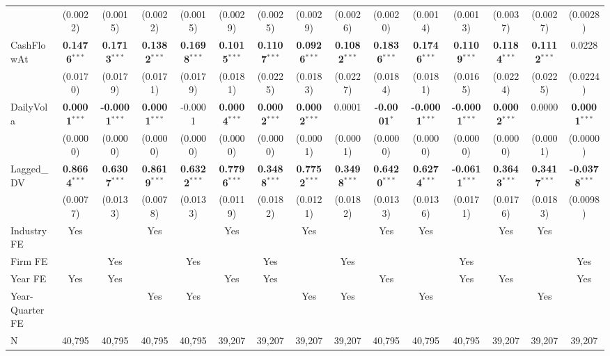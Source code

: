 \documentclass[11pt,a4paper]{article}
\begin{document}
\begin{table}[htbp]
\begin{tabular}{lcccccccccccccc}
 & (0.0022) & (0.0015) & (0.0022) & (0.0015) & (0.0029) & (0.0025) & (0.0029) & (0.0026) & (0.0020) & (0.0014) & (0.0013) & (0.0037) & (0.0027) & (0.0028) \\
CashFlowAt & \textbf{0.1476}$^{***}$ & \textbf{0.1713}$^{***}$ & \textbf{0.1382}$^{***}$ & \textbf{0.1698}$^{***}$ & \textbf{0.1015}$^{***}$ & \textbf{0.1107}$^{***}$ & \textbf{0.0926}$^{***}$ & \textbf{0.1082}$^{***}$ & \textbf{0.1836}$^{***}$ & \textbf{0.1746}$^{***}$ & \textbf{0.1109}$^{***}$ & \textbf{0.1184}$^{***}$ & \textbf{0.1112}$^{***}$ & 0.0228 \\
 & (0.0170) & (0.0179) & (0.0171) & (0.0179) & (0.0181) & (0.0225) & (0.0183) & (0.0227) & (0.0184) & (0.0181) & (0.0165) & (0.0224) & (0.0225) & (0.0224) \\
DailyVola & \textbf{0.0001}$^{***}$ & \textbf{-0.0001}$^{***}$ & \textbf{0.0001}$^{***}$ & -0.0001 & \textbf{0.0004}$^{***}$ & \textbf{0.0002}$^{***}$ & \textbf{0.0002}$^{***}$ & 0.0001 & \textbf{-0.0001}$^{*}$ & \textbf{-0.0001}$^{***}$ & \textbf{-0.0001}$^{***}$ & \textbf{0.0002}$^{***}$ & 0.0000 & \textbf{0.0001}$^{***}$ \\
 & (0.0000) & (0.0000) & (0.0000) & (0.0000) & (0.0000) & (0.0000) & (0.0001) & (0.0001) & (0.0000) & (0.0000) & (0.0000) & (0.0000) & (0.0001) & (0.0000) \\
Lagged\_DV & \textbf{0.8664}$^{***}$ & \textbf{0.6307}$^{***}$ & \textbf{0.8619}$^{***}$ & \textbf{0.6322}$^{***}$ & \textbf{0.7796}$^{***}$ & \textbf{0.3488}$^{***}$ & \textbf{0.7752}$^{***}$ & \textbf{0.3498}$^{***}$ & \textbf{0.6420}$^{***}$ & \textbf{0.6274}$^{***}$ & \textbf{-0.0611}$^{***}$ & \textbf{0.3643}$^{***}$ & \textbf{0.3417}$^{***}$ & \textbf{-0.0378}$^{***}$ \\
 & (0.0077) & (0.0133) & (0.0078) & (0.0133) & (0.0119) & (0.0182) & (0.0121) & (0.0182) & (0.0133) & (0.0136) & (0.0171) & (0.0176) & (0.0183) & (0.0098) \\
\midrule
Industry FE & Yes &  & Yes &  & Yes &  & Yes &  & Yes & Yes &  & Yes & Yes &  \\
Firm FE &  & Yes &  & Yes &  & Yes &  & Yes &  &  & Yes &  &  & Yes \\
Year FE & Yes & Yes &  &  & Yes & Yes &  &  & Yes &  & Yes & Yes &  & Yes \\
Year-Quarter FE &  &  & Yes & Yes &  &  & Yes & Yes &  & Yes &  &  & Yes &  \\
\midrule
N & 40,795 & 40,795 & 40,795 & 40,795 & 39,207 & 39,207 & 39,207 & 39,207 & 40,795 & 40,795 & 40,795 & 39,207 & 39,207 & 39,207 \\

\end{tabular}
\end{table}
\end{document}
